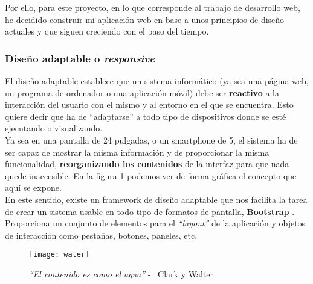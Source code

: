 Por ello, para este proyecto, en lo que corresponde al trabajo de desarrollo web, he decidido construir mi aplicación web en base a unos principios de diseño actuales y que siguen creciendo con el paso del tiempo.

\subsubsection{Diseño adaptable o \textit{responsive}}
El diseño adaptable establece que un sistema informático (ya sea una página web, un programa de ordenador o una aplicación móvil) debe ser \textbf{reactivo} a la interacción del usuario con el mismo y al entorno en el que se encuentra. Esto quiere decir que ha de ``adaptarse'' a todo tipo de dispositivos donde se esté ejecutando o visualizando.\\

Ya sea en una pantalla de 24 pulgadas, o un smartphone de 5, el sistema ha de ser capaz de mostrar la misma información y de proporcionar la misma funcionalidad, \textbf{reorganizando los contenidos} de la interfaz para que nada quede inaccesible. En la figura \ref{water} podemos ver de forma gráfica el concepto que aquí se expone.\\

En este sentido, existe un framework de diseño adaptable que nos facilita la tarea de crear un sistema usable en todo tipo de formatos de pantalla, \textbf{Bootstrap} \cite{bootstrap}. Proporciona un conjunto de elementos para el \textit{``layout''} de la aplicación y objetos de interacción como pestañas, botones, paneles, etc.

\begin{figure}
    \centering
    \texttt{[image: water]}
    \caption{\textit{``El contenido es como el agua''} - \textcopyright\ Clark y Walter \cite{contentwater}}
    \label{water}
\end{figure}
